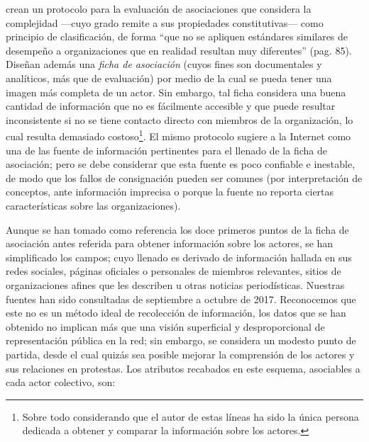 \documentclass[letterpaper, 11pt]{book}
\theoremstyle{definition}
\theoremstyle{remark}
\begin{document}
\citet{2012_REDA_EvaluacionAsociaciones} crean un protocolo para la evaluación de asociaciones que considera la complejidad ---cuyo grado remite a sus propiedades constitutivas--- como principio de clasificación, de forma ``que no se apliquen estándares similares de desempeño a organizaciones que en realidad resultan muy diferentes'' (pag. 85). 
Diseñan además una \emph{ficha de asociación} (cuyos fines son documentales y analíticos, más que de evaluación) por medio de la cual se pueda tener una imagen más completa de un actor. 
Sin embargo, tal ficha considera una buena cantidad de información que no es fácilmente accesible y que puede resultar inconsistente si no se tiene contacto directo con miembros de la organización, lo cual resulta demasiado costoso\footnote{Sobre todo considerando que el autor de estas líneas ha sido la única persona dedicada a obtener y comparar la información sobre los actores.}. 
El mismo protocolo sugiere a la Internet como una de las fuente de información pertinentes para el llenado de la ficha de asociación; pero se debe considerar que esta fuente es poco confiable e inestable, de modo que los fallos de consignación pueden ser comunes (por interpretación de conceptos, ante información imprecisa o porque la fuente no reporta ciertas características sobre las organizaciones). 

Aunque se han tomado como referencia los doce primeros puntos de la ficha de asociación antes referida para obtener información sobre los actores, se han simplificado los campos; cuyo llenado es derivado de información hallada en sus redes sociales, páginas oficiales o personales de miembros relevantes, sitios de organizaciones afines que les describen u otras noticias periodísticas. 
Nuestras fuentes han sido consultadas de septiembre a octubre de 2017. 
Reconocemos que este no es un método ideal de recolección de información, los datos que se han obtenido no implican más que una visión superficial y desproporcional de representación pública en la red; sin embargo, se considera un modesto punto de partida, desde el cual quizás sea posible mejorar la comprensión de los actores y sus relaciones en protestas. 
Los atributos recabados en este esquema, asociables a cada actor colectivo, son: 
\end{document}
